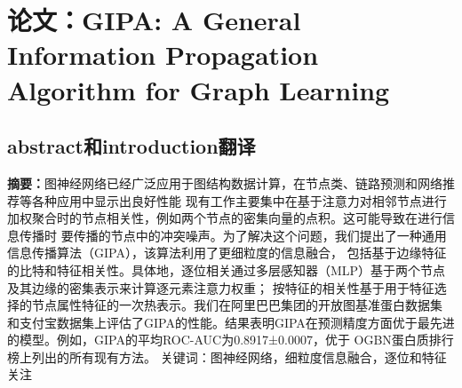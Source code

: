 \documentclass{article}
\begin{document}
\section*{论文：GIPA: A General Information Propagation
Algorithm for Graph Learning}
\subsection*{abstract和introduction翻译}

\textbf{摘要：}图神经网络已经广泛应用于图结构数据计算，在节点类、链路预测和网络推荐等各种应用中显示出良好性能
现有工作主要集中在基于注意力对相邻节点进行加权聚合时的节点相关性，例如两个节点的密集向量的点积。这可能导致在进行信息传播时
要传播的节点中的冲突噪声。为了解决这个问题，我们提出了一种通用信息传播算法（GIPA），该算法利用了更细粒度的信息融合，
包括基于边缘特征的比特和特征相关性。具体地，逐位相关通过多层感知器（MLP）基于两个节点及其边缘的密集表示来计算逐元素注意力权重；
按特征的相关性基于用于特征选择的节点属性特征的一次热表示。我们在阿里巴巴集团的开放图基准蛋白数据集
和支付宝数据集上评估了GIPA的性能。结果表明GIPA在预测精度方面优于最先进的模型。例如，GIPA的平均ROC-AUC为0.8917±0.0007，优于
OGBN蛋白质排行榜上列出的所有现有方法。
关键词：图神经网络，细粒度信息融合，逐位和特征关注\\
\end{document}
